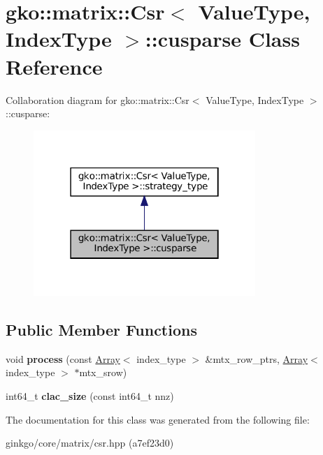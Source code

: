 \hypertarget{classgko_1_1matrix_1_1Csr_1_1cusparse}{}\section{gko\+:\+:matrix\+:\+:Csr$<$ Value\+Type, Index\+Type $>$\+:\+:cusparse Class Reference}
\label{classgko_1_1matrix_1_1Csr_1_1cusparse}


Collaboration diagram for gko\+:\+:matrix\+:\+:Csr$<$ Value\+Type, Index\+Type $>$\+:\+:cusparse\+:
\nopagebreak
\begin{figure}[H]
\begin{center}
\leavevmode
\includegraphics[width=238pt]{classgko_1_1matrix_1_1Csr_1_1cusparse__coll__graph}
\end{center}
\end{figure}
\subsection*{Public Member Functions}
\begin{DoxyCompactItemize}
\item 
\mbox{\label{classgko_1_1matrix_1_1Csr_1_1cusparse_ad913d7450cec714fda555ac1a0c781bc}} 
void {\bfseries process} (const \hyperlink{classgko_1_1Array}{Array}$<$ index\+\_\+type $>$ \&mtx\+\_\+row\+\_\+ptrs, \hyperlink{classgko_1_1Array}{Array}$<$ index\+\_\+type $>$ $\ast$mtx\+\_\+srow)
\item 
\mbox{\label{classgko_1_1matrix_1_1Csr_1_1cusparse_a3a11fb0655b828fb590a87f5f83e9373}} 
int64\+\_\+t {\bfseries clac\+\_\+size} (const int64\+\_\+t nnz)
\end{DoxyCompactItemize}


The documentation for this class was generated from the following file\+:\begin{DoxyCompactItemize}
\item 
ginkgo/core/matrix/csr.\+hpp (a7ef23d0)\end{DoxyCompactItemize}

